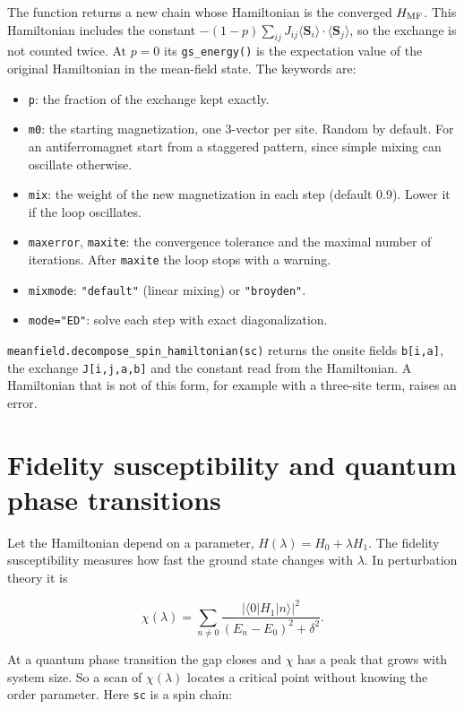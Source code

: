 \documentclass[11pt]{article}
\providecommand{\tightlist}{\setlength{\itemsep}{0pt}\setlength{\parskip}{0pt}}
\begin{document}
The function returns a new chain whose Hamiltonian is the converged
\(H_{\rm MF}\). This Hamiltonian includes the constant
\(-(1-p)\sum_{ij}J_{ij}\langle\mathbf S_i\rangle\cdot\langle\mathbf S_j\rangle\),
so the exchange is not counted twice. At \(p=0\) its \texttt{gs\_\allowbreak{}energy()} is the
expectation value of the original Hamiltonian in the mean-field state.
The keywords are:

\begin{itemize}
\tightlist
\item
  \texttt{p}: the fraction of the exchange kept exactly.
\item
  \texttt{m0}: the starting magnetization, one 3-vector per site. Random by
  default. For an antiferromagnet start from a staggered pattern, since
  simple mixing can oscillate otherwise.
\item
  \texttt{mix}: the weight of the new magnetization in each step (default 0.9).
  Lower it if the loop oscillates.
\item
  \texttt{maxerror}, \texttt{maxite}: the convergence tolerance and the maximal number
  of iterations. After \texttt{maxite} the loop stops with a warning.
\item
  \texttt{mixmode}: \texttt{"default"} (linear mixing) or \texttt{"broyden"}.
\item
  \texttt{mode="ED"}: solve each step with exact diagonalization.
\end{itemize}

\texttt{meanfield.\allowbreak{}decompose\_\allowbreak{}spin\_\allowbreak{}hamiltonian(sc)} returns the onsite fields
\texttt{b{[}i,a{]}}, the exchange \texttt{J{[}i,j,a,b{]}} and the constant read from the
Hamiltonian. A Hamiltonian that is not of this form, for example with a
three-site term, raises an error.

\section{Fidelity susceptibility and quantum phase transitions}

Let the Hamiltonian depend on a parameter, \(H(\lambda)=H_0+\lambda H_1\).
The fidelity susceptibility measures how fast the ground state changes
with \(\lambda\). In perturbation theory it is

\[\chi(\lambda)=\sum_{n\neq0}\frac{|\langle 0|H_1|n\rangle|^2}{(E_n-E_0)^2+\delta^2}.\]

At a quantum phase transition the gap closes and \(\chi\) has a peak that
grows with system size. So a scan of \(\chi(\lambda)\) locates a critical
point without knowing the order parameter. Here \texttt{sc} is a spin chain:
\end{document}
